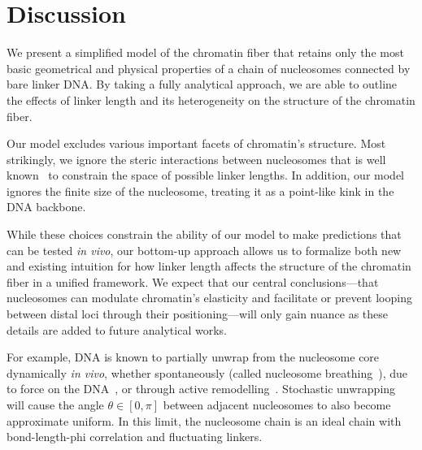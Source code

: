 \documentclass[%
 reprint,
superscriptaddress,
showpacs,preprintnumbers,
 amsmath,amssymb,
 aps,
 prl,
]{revtex4-1}
\begin{document}
\section{\label{sec:discussion}Discussion}

We present a simplified model of the chromatin fiber that retains only the most
    basic geometrical and physical properties of a chain of nucleosomes
    connected by bare linker DNA.\@
By taking a fully analytical approach, we are able to outline the effects of
    linker length and its heterogeneity on the structure of the chromatin fiber.

Our model excludes various important facets of chromatin's structure.
Most strikingly, we ignore the steric interactions between nucleosomes that is
    well known~\cite{widom1992} to constrain the space of possible linker
    lengths.
In addition, our model ignores the finite size of the nucleosome, treating it as
    a point-like kink in the DNA backbone.

While these choices constrain the ability of our model to make predictions that
    can be tested \textit{in vivo}, our bottom-up approach allows us to
    formalize both new and existing intuition for how linker length affects the
    structure of the chromatin fiber in a unified framework.
We expect that our central conclusions---that nucleosomes can modulate
    chromatin's elasticity and facilitate or prevent looping between distal loci
    through their positioning---will only gain nuance as these details are added
    to future analytical works.

    For example, DNA is known to partially unwrap from the nucleosome core dynamically \textit{in
    vivo}, whether spontaneously (called nucleosome breathing~\cite{TODO}), due to
    force on the DNA~\cite{TODO}, or through active
    remodelling~\cite{dion2007,kulaeva2007,senavirathne2017}. Stochastic
    unwrapping will cause the angle $\theta \in [0, \pi]$ between adjacent nucleosomes to
    also become approximate uniform. In this limit, the nucleosome chain is an
    ideal chain with bond-length-phi correlation and fluctuating linkers.
\end{document}
